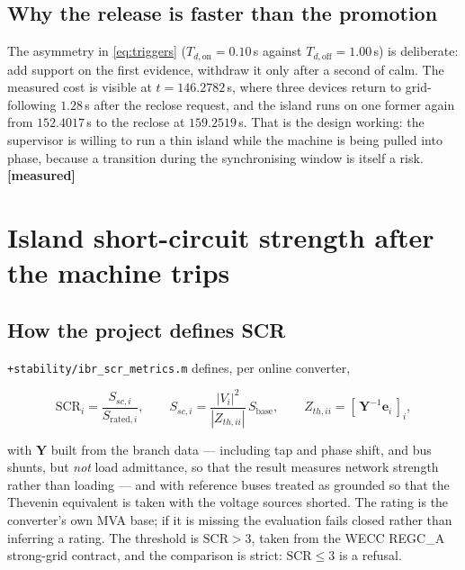 \documentclass[12pt,a4paper]{article}
\theoremstyle{remark}
\newcommand{\code}[1]{\texttt{\small #1}}
\newcommand{\measured}{\textcolor{ok}{\textbf{[measured]}}}
\begin{document}
\subsection{Why the release is faster than the promotion}

The asymmetry in \eqref{eq:triggers} ($T_{d,\mathrm{on}} = 0.10$\,s against
$T_{d,\mathrm{off}} = 1.00$\,s) is deliberate: add support on the first evidence,
withdraw it only after a second of calm. The measured cost is visible at
$t = 146.2782$\,s, where three devices return to grid-following
$1.28$\,s after the reclose request, and the island runs on one former again
from $152.4017$\,s to the reclose at $159.2519$\,s. That is the design working:
the supervisor is willing to run a thin island while the machine is being pulled
into phase, because a transition during the synchronising window is itself a
risk. \measured

\section{Island short-circuit strength after the machine trips}\label{sec:scr}

\subsection{How the project defines SCR}

\code{+stability/ibr\_scr\_metrics.m} defines, per online converter,

\begin{equation}
\mathrm{SCR}_i = \frac{S_{sc,i}}{S_{\mathrm{rated},i}},
\qquad
S_{sc,i} = \frac{|V_i|^2}{|Z_{th,ii}|}\,S_{\text{base}},
\qquad
Z_{th,ii} = \left[\,\mathbf{Y}^{-1}\mathbf{e}_i\,\right]_i ,
\label{eq:scr}
\end{equation}

with $\mathbf{Y}$ built from the branch data --- including tap and phase shift,
and bus shunts, but \emph{not} load admittance, so that the result measures
network strength rather than loading --- and with reference buses treated as
grounded so that the Thevenin equivalent is taken with the voltage sources
shorted. The rating is the converter's own MVA base; if it is missing the
evaluation fails closed rather than inferring a rating. The threshold is
$\mathrm{SCR} > 3$, taken from the WECC REGC\_A strong-grid contract, and the
comparison is strict: $\mathrm{SCR} \le 3$ is a refusal.
\end{document}
